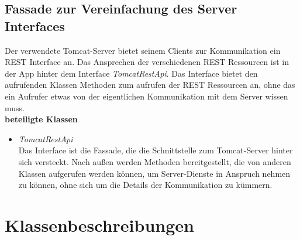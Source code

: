 \subsection{Fassade zur Vereinfachung des Server Interfaces}
Der verwendete Tomcat-Server bietet seinem Clients zur Kommunikation ein REST Interface an. Das Ansprechen der verschiedenen REST Ressourcen ist in der App hinter dem Interface \textit{TomcatRestApi}. Das Interface bietet den aufrufenden Klassen Methoden zum aufrufen der REST Ressourcen an, ohne das ein Aufrufer etwas von der eigentlichen Kommunikation mit dem Server wissen muss. \\

\textbf{beteiligte Klassen}
\begin{itemize}
	\item \textit{TomcatRestApi} \\
	Das Interface ist die Fassade, die die Schnittstelle zum Tomcat-Server hinter sich versteckt. Nach außen werden Methoden bereitgestellt, die von anderen Klassen aufgerufen werden können, um Server-Dienste in Anspruch nehmen zu können, ohne sich um die Details der Kommunikation zu kümmern.
\end{itemize}

\section{Klassenbeschreibungen}

